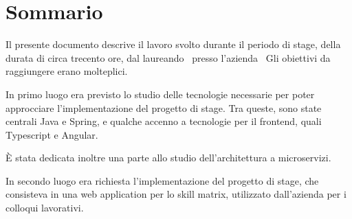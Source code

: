 
\cleardoublepage
{}
{}
\begingroup
\let\clearpage\relax
\let\cleardoublepage\relax
\let\cleardoublepage\relax

\chapter*{Sommario}

Il presente documento descrive il lavoro svolto durante il periodo di stage, della durata di circa trecento ore, dal laureando \myName\ presso l'azienda \myCompany\
Gli obiettivi da raggiungere erano molteplici.

In primo luogo era previsto lo studio delle tecnologie necessarie per poter approcciare l'implementazione del progetto di stage. Tra queste, sono state centrali
Java e Spring, e qualche accenno a tecnologie per il frontend, quali Typescript e Angular.

\noindent È stata dedicata inoltre una parte allo studio dell'architettura a microservizi.

In secondo luogo era richiesta l'implementazione del progetto di stage, che consisteva in una web application per lo skill matrix, utilizzato dall'azienda per i colloqui
lavorativi.

%
%

\endgroup

\vfill
